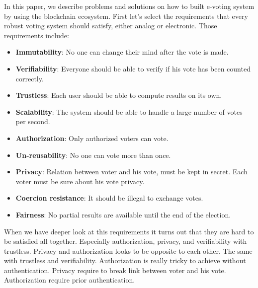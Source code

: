 \documentclass[runningheads]{llncs}
\begin{document}

In this paper, we describe problems and solutions on how to built e-voting system by 
using the  blockchain ecosystem. 
First let's select   the requirements that every robust voting system should satisfy, either analog or electronic. Those requirements include:
\begin{itemize}
\item \textbf{Immutability}: No one can change their mind after the vote is made.
\item \textbf{Verifiability}: Everyone should be able to verify if his vote has been counted correctly.
\item \textbf{Trustless}: Each user should be able to compute results on its own.
\item \textbf{Scalability}: The system should be able to handle a large number of votes per second.
\item \textbf{Authorization}: Only authorized voters can vote.
\item \textbf{Un-reusability}: No one can vote more than once.
\item \textbf{Privacy}: Relation between voter and his vote, must be kept in secret. Each voter must be sure about his vote privacy. 
\item \textbf{Coercion resistance}: It should be illegal to exchange votes.
\item \textbf{Fairness}: No partial results are available until the end of the election.
\end{itemize}

When we have deeper look at this requirements 
it turns out that they are hard to be satisfied all together. Especially authorization, privacy, and verifiability with trustless. 
Privacy and authorization looks to be opposite to each other. 
The same with trustless and verifiability. Authorization is 
really tricky to achieve without authentication. 
Privacy require to break link between voter and his vote. Authorization require prior authentication. 
\end{document}

